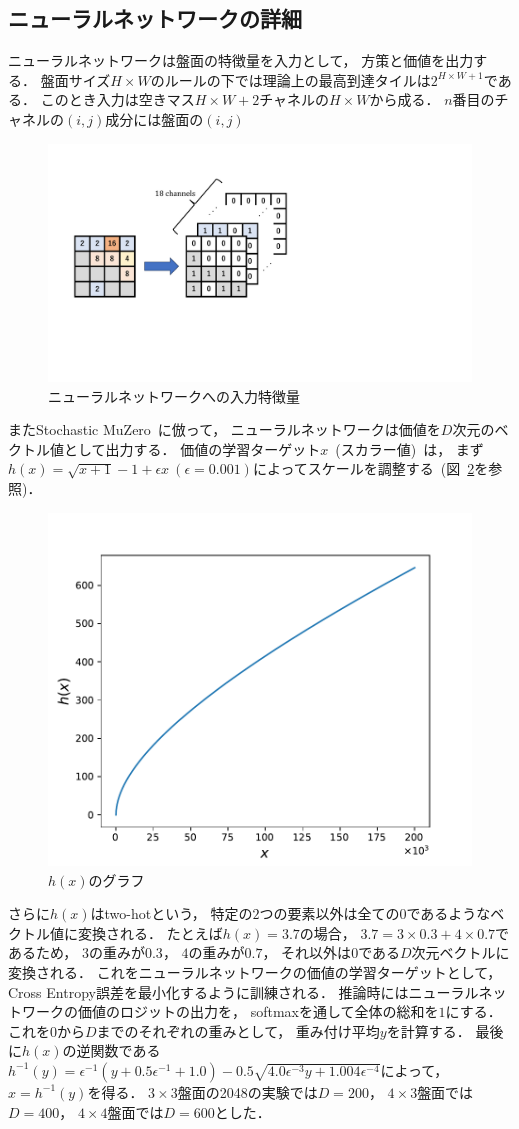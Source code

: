 \subsection{ニューラルネットワークの詳細}
\label{subsec:nn_impl}
ニューラルネットワークは盤面の特徴量を入力として， 方策と価値を出力する．
盤面サイズ$H \times W$のルールの下では理論上の最高到達タイルは$2^{H \times W + 1}$である．
このとき入力は空きマス$H \times W + 2$チャネルの$H \times W$から成る．
$n$番目のチャネルの$(i,j)$成分には盤面の$(i,j)$
\begin{figure}[t]
    \centering
    \includegraphics[width=0.6\linewidth{}]{figures/encoding.pdf}
    \caption{ニューラルネットワークへの入力特徴量}
    \label{fig:input_encoding}
\end{figure}

またStochastic MuZero~\cite{StochasticMuZero}に倣って， ニューラルネットワークは価値を$D$次元のベクトル値として出力する．
価値の学習ターゲット$x$~(スカラー値)~は， まず$h(x)= \sqrt{x+1} - 1 + \epsilon x \ (\epsilon=0.001)$によってスケールを調整する~(図~\ref{fig:transform}を参照)．
\begin{figure}[t]
    \centering
    \includegraphics[width=0.6\linewidth{}]{figures/transform_.pdf}
    \caption{$h(x)$のグラフ}
    \label{fig:transform}
\end{figure}
さらに$h(x)$はtwo-hotという， 特定の$2$つの要素以外は全ての$0$であるようなベクトル値に変換される．
たとえば$h(x)=3.7$の場合， $3.7=3 \times 0.3 + 4 \times 0.7$であるため， $3$の重みが$0.3$， $4$の重みが$0.7$， それ以外は$0$である$D$次元ベクトルに変換される．
これをニューラルネットワークの価値の学習ターゲットとして， Cross Entropy誤差を最小化するように訓練される．
推論時にはニューラルネットワークの価値のロジットの出力を， softmaxを通して全体の総和を$1$にする．
これを$0$から$D$までのそれぞれの重みとして， 重み付け平均$y$を計算する．
最後に$h(x)$の逆関数である$h^{-1}(y)= \epsilon^{-1} (y + 0.5\epsilon^{-1} + 1.0) - 0.5 \sqrt{4.0 \epsilon^{-3} y + 1.004 \epsilon^{-4}}$によって， $x=h^{-1}(y)$を得る．
$3\times3$盤面の2048の実験では$D=200$， $4\times3$盤面では$D=400$， $4\times4$盤面では$D=600$とした．

